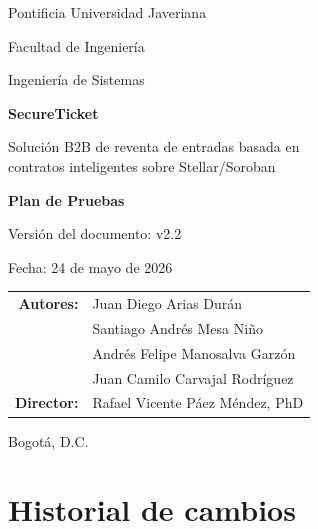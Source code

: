\documentclass[12pt,letterpaper]{article}
\newcommand{\NombreProyecto}{SecureTicket}
\newcommand{\NombreDocumento}{Plan de Pruebas}
\newcommand{\VersionDocumento}{v2.2}
\newcommand{\FechaDocumento}{24 de mayo de 2026}
\newcommand{\Institucion}{Pontificia Universidad Javeriana}
\newcommand{\Facultad}{Facultad de Ingeniería}
\newcommand{\Programa}{Ingeniería de Sistemas}
\newcommand{\Ciudad}{Bogotá, D.C.}
\begin{document}
\begin{titlepage}
    \centering

    \vspace*{0.5cm}

    {\Large \Institucion \par}
    {\large \Facultad \par}
    {\large \Programa \par}

    \vspace{1.4cm}

    {\Huge \textbf{\NombreProyecto} \par}
    \vspace{0.3cm}
    {\Large Solución B2B de reventa de entradas basada en\\contratos inteligentes sobre Stellar/Soroban \par}
    \vspace{0.5cm}
    {\LARGE \textbf{\NombreDocumento} \par}

    \vspace{0.8cm}

    {\large Versión del documento: \VersionDocumento \par}
    {\large Fecha: \FechaDocumento \par}

    \vspace{1.2cm}

    \begin{tabular}{rl}
        \textbf{Autores:} & Juan Diego Arias Durán \\
                          & Santiago Andrés Mesa Niño \\
                          & Andrés Felipe Manosalva Garzón \\
                          & Juan Camilo Carvajal Rodríguez \\
        \textbf{Director:} & Rafael Vicente Páez Méndez, PhD \\
    \end{tabular}

    \vfill

    {\large \Ciudad \par}
    {\large \the\year \par}
\end{titlepage}

\section*{Historial de cambios}
\end{document}
